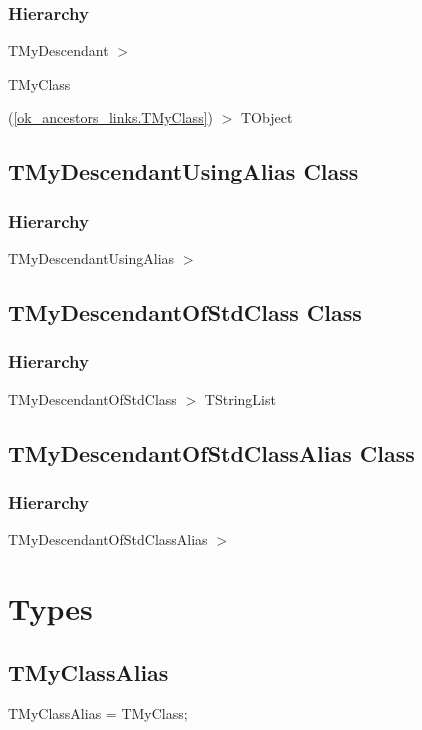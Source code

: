 \documentclass{report}
\begin{document}
\subsubsection*{\large{\textbf{Hierarchy}}\normalsize\hspace{1ex}\hfill}
TMyDescendant {$>$} \begin{ttfamily}TMyClass\end{ttfamily}(\ref{ok_ancestors_links.TMyClass}) {$>$} 
TObject
\subsection*{TMyDescendantUsingAlias Class}
\subsubsection*{\large{\textbf{Hierarchy}}\normalsize\hspace{1ex}\hfill}
TMyDescendantUsingAlias {$>$} %
\subsection*{TMyDescendantOfStdClass Class}
\subsubsection*{\large{\textbf{Hierarchy}}\normalsize\hspace{1ex}\hfill}
TMyDescendantOfStdClass {$>$} TStringList
\subsection*{TMyDescendantOfStdClassAlias Class}
\subsubsection*{\large{\textbf{Hierarchy}}\normalsize\hspace{1ex}\hfill}
TMyDescendantOfStdClassAlias {$>$} %
\section{Types}
\subsection*{TMyClassAlias}
\begin{list}{}{
\setlength{\itemindent}{0cm}
\setlength{\listparindent}{0cm}
\setlength{\leftmargin}{\evensidemargin}
\addtolength{\leftmargin}{\tmplength}
\settowidth{\labelsep}{X}
\addtolength{\leftmargin}{\labelsep}
\setlength{\labelwidth}{\tmplength}
}
\begin{flushleft}
\item[\textbf{Declaration}\hfill]
\begin{ttfamily}
TMyClassAlias = TMyClass;\end{ttfamily}


\end{flushleft}
\end{list}
\end{document}
